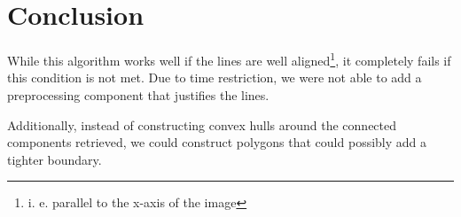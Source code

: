 \documentclass[conference]{IEEEtran}
\begin{document}
\section{Conclusion}
While this algorithm works well if the lines are well aligned\footnote{i. e. parallel to the x-axis of the image}, 
it completely fails if this condition is not met.
Due to time restriction, 
we were not able to add a preprocessing component that justifies the lines.

Additionally, instead of constructing convex hulls around the connected components
retrieved, we could construct polygons that could possibly add a tighter boundary.

%
%



%
%
\end{document}
